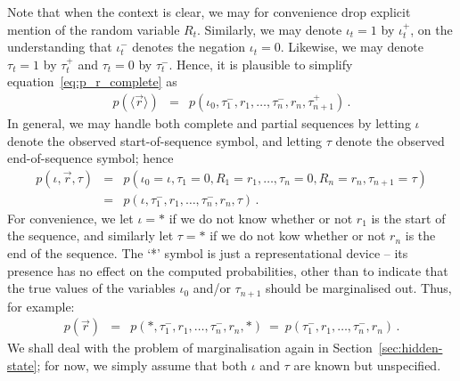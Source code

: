 \documentclass[a4paper]{article}
\begin{document}
Note that when the context is clear, we may for convenience drop explicit mention of the random variable $R_t$.
Similarly, we may denote $\iota_t=1$ by $\iota^+_t$, on the understanding that $\iota^-_t$ denotes the negation $\iota_t=0$.
Likewise, we may denote $\tau_t=1$ by $\tau^+_t$ and $\tau_t=0$ by $\tau^-_t$.
Hence, it is plausible to simplify equation~\eqref{eq:p_r_complete} as
\begin{eqnarray}
p(\langle\vec{r}\rangle) 
& = & p(\iota_0,\tau^-_1,r_1,\ldots,\tau^-_n,r_n,\tau^+_{n+1})\,.
\end{eqnarray}
In general, we may handle both complete and partial sequences by letting ${\iota}$ denote the observed start-of-sequence symbol, and
letting ${\tau}$ denote the observed end-of-sequence symbol; hence
\begin{eqnarray}
p({\iota},\vec{r},{\tau})
& = & p(\iota_0\!=\!{\iota},\tau_1\!=\!0,R_1\!=\!r_1,\ldots,\tau_n\!=\!0,R_n\!=\!r_n,\tau_{n+1}\!=\!{\tau})
\nonumber\\
& = & p({\iota},\tau^-_1,r_1,\ldots,\tau^-_n,r_n,{\tau})\,.
\end{eqnarray}
For convenience, we let ${\iota}=*$ if we do not know whether or not $r_1$ is the start of the sequence,
and similarly let ${\tau}=*$ if we do not kow whether or not $r_n$ is the end of the sequence.
The `*' symbol is just a representational device -- its presence has no effect on the computed probabilities, other than to indicate that the true values
of the variables $\iota_0$ and/or $\tau_{n+1}$ should be marginalised out. Thus, for example:
\begin{eqnarray}
p(\vec{r}) 
& = & p(*,\tau^-_1,r_1,\ldots,\tau^-_n,r_n,*)~=~p(\tau^-_1,r_1,\ldots,\tau^-_n,r_n)\,.
\end{eqnarray}
We shall deal with the problem of marginalisation again in Section~\ref{sec:hidden-state}; for now, we simply assume that both ${\iota}$ and
${\tau}$ are known but unspecified.
\end{document}

